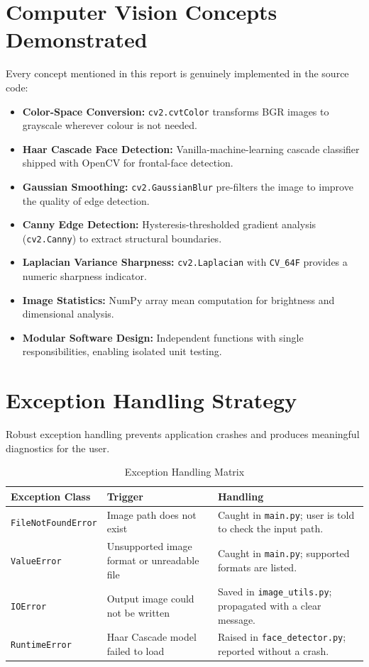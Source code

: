 \documentclass[11pt,a4paper]{article}
\begin{document}
\section{Computer Vision Concepts Demonstrated}
Every concept mentioned in this report is genuinely implemented in the source code:
\begin{itemize}[leftmargin=1.5em]
    \item \textbf{Color-Space Conversion:} \texttt{cv2.cvtColor} transforms BGR images to grayscale wherever colour is not needed.
    \item \textbf{Haar Cascade Face Detection:} Vanilla-machine-learning cascade classifier shipped with OpenCV for frontal-face detection.
    \item \textbf{Gaussian Smoothing:} \texttt{cv2.GaussianBlur} pre-filters the image to improve the quality of edge detection.
    \item \textbf{Canny Edge Detection:} Hysteresis-thresholded gradient analysis (\texttt{cv2.Canny}) to extract structural boundaries.
    \item \textbf{Laplacian Variance Sharpness:} \texttt{cv2.Laplacian} with \texttt{CV\_64F} provides a numeric sharpness indicator.
    \item \textbf{Image Statistics:} NumPy array mean computation for brightness and dimensional analysis.
    \item \textbf{Modular Software Design:} Independent functions with single responsibilities, enabling isolated unit testing.
\end{itemize}

\section{Exception Handling Strategy}
Robust exception handling prevents application crashes and produces meaningful diagnostics for the user.

\begin{table}[H]
\centering
\small
\renewcommand{\arraystretch}{1.2}
\begin{tabularx}{\textwidth}{p{4.6cm}p{3.4cm}X}
\toprule
\textbf{Exception Class} & \textbf{Trigger} & \textbf{Handling} \\
\midrule
\texttt{FileNotFoundError} & Image path does not exist & Caught in \texttt{main.py}; user is told to check the input path. \\
\texttt{ValueError} & Unsupported image format or unreadable file & Caught in \texttt{main.py}; supported formats are listed. \\
\texttt{IOError} & Output image could not be written & Saved in \texttt{image\_utils.py}; propagated with a clear message. \\
\texttt{RuntimeError} & Haar Cascade model failed to load & Raised in \texttt{face\_detector.py}; reported without a crash. \\
\bottomrule
\end{tabularx}
\caption{Exception Handling Matrix}
\label{tab:exceptions}
\end{table}
\end{document}

